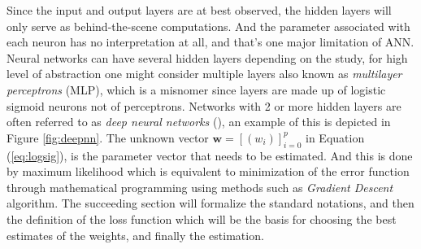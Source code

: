 Since the input and output layers are at best observed, the hidden layers will only serve as behind-the-scene computations. And the parameter associated with each neuron has no interpretation at all, and that's one major limitation of ANN. Neural networks can have several hidden layers depending on the study, for high level of abstraction one might consider multiple layers also known as \textit{multilayer perceptrons} (MLP), which is a misnomer since layers are made up of logistic sigmoid neurons not of perceptrons. Networks with 2 or more hidden layers are often referred to as \textit{deep neural networks} (\cite{nndeepl}), an example of this is depicted in Figure \ref{fig:deepnn}. The unknown vector $\mathbf{w}=[(w_i)]_{i=0}^p$ in Equation (\ref{eq:logsig}), is the parameter vector that needs to be estimated. And this is done by maximum likelihood which is equivalent to minimization of the error function through mathematical programming using methods such as \textit{Gradient Descent} algorithm. The succeeding section will formalize the standard notations, and then the definition of the loss function which will be the basis for choosing the best estimates of the weights, and finally the estimation.

